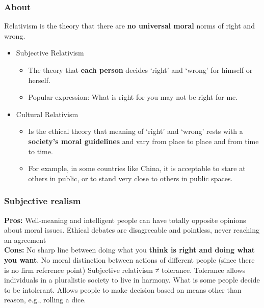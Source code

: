 \documentclass{article}
\begin{document}
\subsubsection{About}
\begin{flushleft}
Relativism is the theory that there are \textbf{no universal moral} norms of right and wrong. 
\end{flushleft}
\begin{itemize}
  \item Subjective Relativism
  \begin{itemize}
    \item The theory that \textbf{each person} decides ‘right’ and ‘wrong’ for himself or herself.
    \item Popular expression: What is right for you may not be right for me.
  \end{itemize}
  \item Cultural Relativism 
  \begin{itemize}
    \item Is the ethical theory that meaning of ‘right’ and ‘wrong’ rests with a \textbf{society’s moral guidelines} and vary from place to place and from time to time.
    \item For example, in some countries like China, it is acceptable to stare at others in public, or to stand very close to others in public spaces.
  \end{itemize}
\end{itemize}

\subsubsection{Subjective realism}
\begin{flushleft}
  \textbf{Pros:} Well-meaning and intelligent people can have totally opposite opinions about moral issues. Ethical debates are disagreeable and pointless, never reaching an agreement\\
  \textbf{Cons:} No sharp line between doing what you \textbf{think is right and doing what you want}. No moral distinction between actions of different people (since there is no firm reference point) Subjective relativism ≠ tolerance. Tolerance allows individuals in a pluralistic society to live in harmony. What is some people decide to be intolerant. Allows people to make decision based on means other than reason, e.g., rolling a dice.
\end{flushleft}
\end{document}
